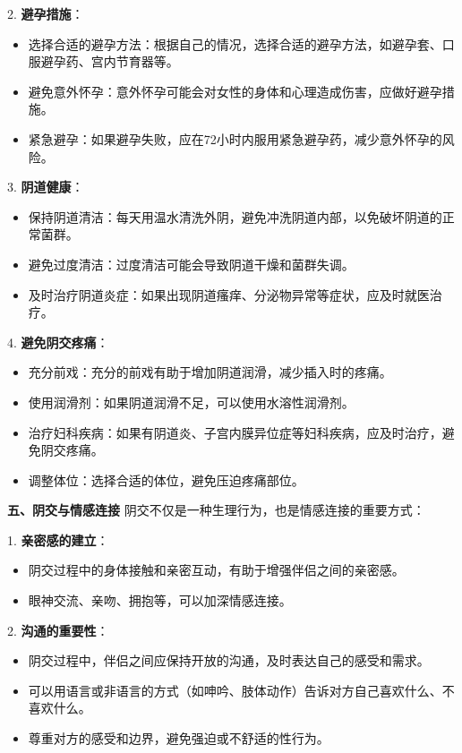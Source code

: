 \documentclass[12pt,UTF8]{ctexbook}
\begin{document}
2. \textbf{避孕措施}：
\begin{itemize}
	\item 选择合适的避孕方法：根据自己的情况，选择合适的避孕方法，如避孕套、口服避孕药、宫内节育器等。
	\item 避免意外怀孕：意外怀孕可能会对女性的身体和心理造成伤害，应做好避孕措施。
	\item 紧急避孕：如果避孕失败，应在72小时内服用紧急避孕药，减少意外怀孕的风险。
\end{itemize}

3. \textbf{阴道健康}：
\begin{itemize}
	\item 保持阴道清洁：每天用温水清洗外阴，避免冲洗阴道内部，以免破坏阴道的正常菌群。
	\item 避免过度清洁：过度清洁可能会导致阴道干燥和菌群失调。
	\item 及时治疗阴道炎症：如果出现阴道瘙痒、分泌物异常等症状，应及时就医治疗。
\end{itemize}

4. \textbf{避免阴交疼痛}：
\begin{itemize}
	\item 充分前戏：充分的前戏有助于增加阴道润滑，减少插入时的疼痛。
	\item 使用润滑剂：如果阴道润滑不足，可以使用水溶性润滑剂。
	\item 治疗妇科疾病：如果有阴道炎、子宫内膜异位症等妇科疾病，应及时治疗，避免阴交疼痛。
	\item 调整体位：选择合适的体位，避免压迫疼痛部位。
\end{itemize}

\textbf{五、阴交与情感连接}
阴交不仅是一种生理行为，也是情感连接的重要方式：

1. \textbf{亲密感的建立}：
\begin{itemize}
	\item 阴交过程中的身体接触和亲密互动，有助于增强伴侣之间的亲密感。
	\item 眼神交流、亲吻、拥抱等，可以加深情感连接。
\end{itemize}

2. \textbf{沟通的重要性}：
\begin{itemize}
	\item 阴交过程中，伴侣之间应保持开放的沟通，及时表达自己的感受和需求。
	\item 可以用语言或非语言的方式（如呻吟、肢体动作）告诉对方自己喜欢什么、不喜欢什么。
	\item 尊重对方的感受和边界，避免强迫或不舒适的性行为。
\end{itemize}
\end{document}
